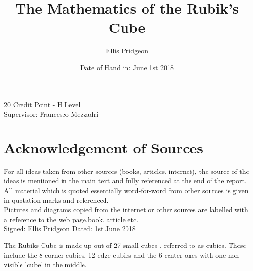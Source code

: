\documentclass{article}
\author{Ellis Pridgeon}
\title{The Mathematics of the Rubik's Cube}\vspace{-50pt}
\date{Date of Hand in: June 1st 2018}
\begin{document}
\maketitle
\begin{center}
20 Credit Point - H Level\\ 
Supervisor: Francesco Mezzadri
\end{center}
\newpage
\section{Acknowledgement of Sources}
\begin{center}
For all ideas taken from other sources (books, articles, internet), the source of the ideas is mentioned in the main text and fully referenced at the end of the report.\\
All material which is quoted essentially word-for-word from other sources is given in quotation marks and referenced.\\
Pictures and diagrams copied from the internet or other sources are labelled with a reference to the web page,book, article etc.\\

Signed: Ellis Pridgeon
Dated: 1st June 2018
\end{center}
\newpage
\tableofcontents
\newpage
\medskip
The Rubiks Cube is made up out of 27 small cubes , referred to as cubies. These include the 8 corner cubies, 12 edge cubies and the 6 center ones with one non-visible 'cube' in the middle.
\begin{figure}[h]
{
	\hspace{-10cm}
}
\end{figure}
\end{document}
